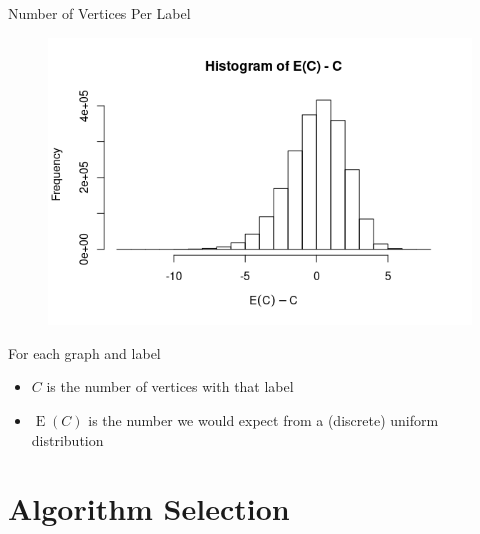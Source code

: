 \documentclass{beamer}
\DeclareMathOperator{\E}{E}
\begin{document}
\begin{frame}{Number of Vertices Per Label}
  \begin{figure}
    \centering
    \includegraphics[scale=0.4]{../dissertation/images/labelling_histogram.png}
  \end{figure}
  For each graph and label
  \begin{itemize}
  \item $C$ is the number of vertices with that label
  \item $\E(C)$ is the number we would expect from a (discrete) uniform distribution
  \end{itemize}
\end{frame}

\section{Algorithm Selection}
\end{document}
